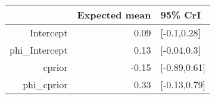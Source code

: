 \begin{tabular}{rrl}
  \hline
 & Expected mean & 95\% CrI \\ 
  \hline
Intercept & 0.09 & [-0.1,0.28] \\ 
  phi\_Intercept & 0.13 & [-0.04,0.3] \\ 
  cprior & -0.15 & [-0.89,0.61] \\ 
  phi\_cprior & 0.33 & [-0.13,0.79] \\ 
   \hline
\end{tabular}

